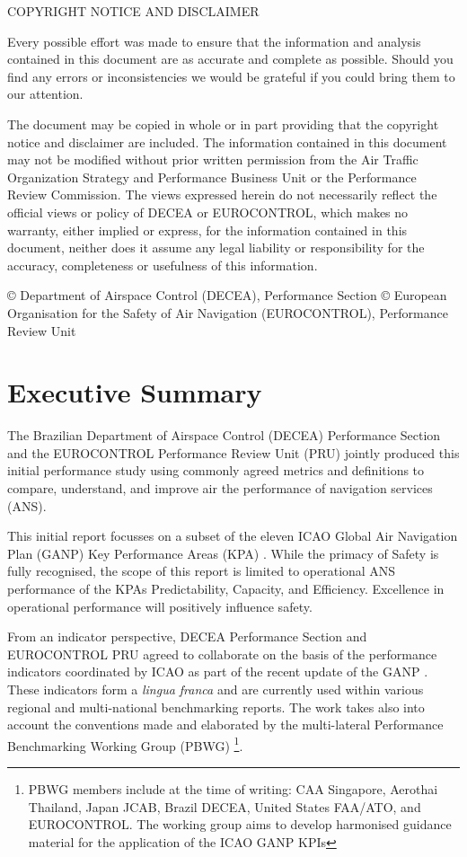 \documentclass[
]{book}
\begin{document}
COPYRIGHT NOTICE AND DISCLAIMER

Every possible effort was made to ensure that the information and analysis contained in this document are as
accurate and complete as possible.
Should you find any errors or inconsistencies we would be grateful if you could bring them to our attention.

The document may be copied in whole or in part providing that the copyright notice and disclaimer are included.
The information contained in this document may not be modified without prior written permission from the Air Traffic
Organization Strategy and Performance Business Unit or the Performance Review Commission.
The views expressed herein do not necessarily reflect the official views or policy of DECEA or EUROCONTROL,
which makes no warranty, either implied or express, for the information contained in this document, neither does it
assume any legal liability or responsibility for the accuracy, completeness or usefulness of this information.

© Department of Airspace Control (DECEA), Performance Section
© European Organisation for the Safety of Air Navigation (EUROCONTROL), Performance Review Unit

\hypertarget{executive-summary}{%
\chapter{Executive Summary}\label{executive-summary}}

The Brazilian Department of Airspace Control (DECEA) Performance Section and the EUROCONTROL Performance Review Unit (PRU) jointly produced this initial performance study using commonly agreed metrics and definitions to compare, understand, and improve air the performance of navigation services (ANS).

This initial report focusses on a subset of the eleven ICAO Global Air Navigation Plan (GANP) Key Performance Areas (KPA) \citep[Appendix D]{icao_2005}.
While the primacy of Safety is fully recognised, the scope of this report is limited to operational ANS performance of the KPAs Predictability, Capacity, and Efficiency.
Excellence in operational performance will positively influence safety.

From an indicator perspective, DECEA Performance Section and EUROCONTROL PRU agreed to collaborate on the basis of the performance indicators coordinated by ICAO as part of the recent update of the GANP \citep{icao_doc9750_2016}.
These indicators form a \emph{lingua franca} and are currently used within various regional and multi-national benchmarking reports.
The work takes also into account the conventions made and elaborated by the multi-lateral Performance Benchmarking Working Group (PBWG) \footnote{PBWG members include at the time of writing: CAA Singapore, Aerothai Thailand, Japan JCAB, Brazil DECEA, United States FAA/ATO, and EUROCONTROL. The working group aims to develop harmonised guidance material for the application of the ICAO GANP KPIs}.
\end{document}
